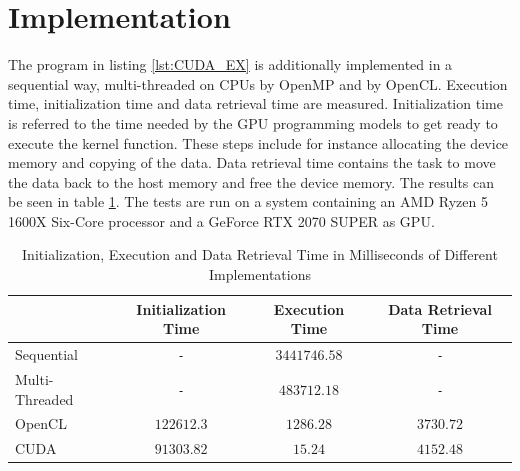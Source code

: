 \documentclass[a4paper,12pt]{llncs}
\numberwithin{equation}{section}
\begin{document}
\section{Implementation}
The program in listing \ref{lst:CUDA_EX} is additionally implemented in a sequential way, multi-threaded on CPUs by OpenMP and by OpenCL.
Execution time, initialization time and data retrieval time are measured.
Initialization time is referred to the time needed by the GPU programming models to get ready to execute the kernel function.
These steps include for instance allocating the device memory and copying of the data.
Data retrieval time contains the task to move the data back to the host memory and free the device memory.
The results can be seen in table \ref{tab:time}.
The tests are run on a system containing an AMD Ryzen 5 1600X Six-Core processor and a GeForce RTX 2070 SUPER as GPU.
\begin{table}[htbp]
  \centering
  \caption{Initialization, Execution and Data Retrieval Time in Milliseconds of Different Implementations}
  \label{tab:time}
  \begin{tabular}{|l|c|c|c|}
	\hline
	& Initialization Time & Execution Time & Data Retrieval Time \\\hline
	Sequential & \texttt{-} & \(3441746.58\) & \texttt{-} \\\hline
	Multi-Threaded & \texttt{-} & \(483712.18\) & \texttt{-} \\\hline
	OpenCL & \(122612.3\) & \(1286.28\) & \(3730.72\) \\\hline
	CUDA & \(91303.82\) & \(15.24\) & \(4152.48\) \\\hline
  \end{tabular}
\end{table}
\end{document}
